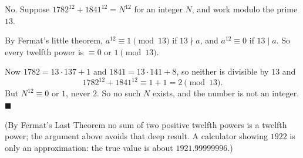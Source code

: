 No. Suppose $1782^{12}+1841^{12}=N^{12}$ for an integer $N$, and work modulo the prime $13$.

By Fermat's little theorem, $a^{12}\equiv1\pmod{13}$ if $13\nmid a$, and $a^{12}\equiv0$ if $13\mid a$. So every twelfth power is $\equiv0$ or $1\pmod{13}$.

Now $1782=13\cdot137+1$ and $1841=13\cdot141+8$, so neither is divisible by $13$ and
\[
1782^{12}+1841^{12}\equiv1+1=2\pmod{13}.
\]
But $N^{12}\equiv0$ or $1$, never $2$. So no such $N$ exists, and the number is $\boxed{\text{not an integer}}$. $\blacksquare$

(By Fermat's Last Theorem no sum of two positive twelfth powers is a twelfth power; the argument above avoids that deep result. A calculator showing $1922$ is only an approximation: the true value is about $1921.99999996$.)

